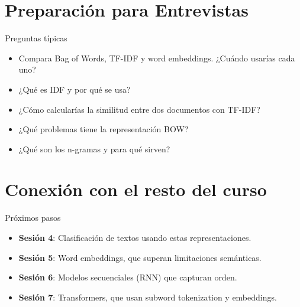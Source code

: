 \documentclass[aspectratio=169, 10pt, xcolor=table]{beamer}
\begin{document}
\section{Preparación para Entrevistas}

\begin{frame}{Preguntas típicas}
    \begin{itemize}
        \item Compara Bag of Words, TF-IDF y word embeddings. ¿Cuándo usarías cada uno?
        \item ¿Qué es IDF y por qué se usa?
        \item ¿Cómo calcularías la similitud entre dos documentos con TF-IDF?
        \item ¿Qué problemas tiene la representación BOW?
        \item ¿Qué son los n-gramas y para qué sirven?
    \end{itemize}
\end{frame}

\section{Conexión con el resto del curso}

\begin{frame}{Próximos pasos}
    \begin{itemize}
        \item \textbf{Sesión 4}: Clasificación de textos usando estas representaciones.
        \item \textbf{Sesión 5}: Word embeddings, que superan limitaciones semánticas.
        \item \textbf{Sesión 6}: Modelos secuenciales (RNN) que capturan orden.
        \item \textbf{Sesión 7}: Transformers, que usan subword tokenization y embeddings.
    \end{itemize}
\end{frame}

\end{document}

